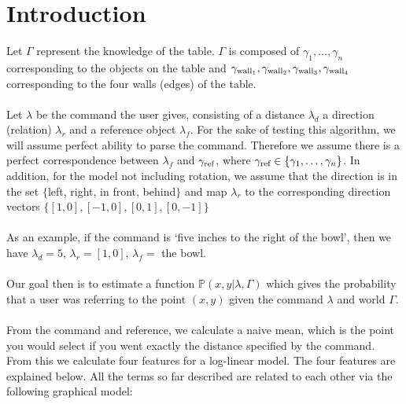 \documentclass[12pt,letterpaper]{article}
\newcommand\refobj{\textmd{ref}}
\begin{document}
\section*{Introduction}
Let $\Gamma$ represent the knowledge of the table. $\Gamma$ is composed of $\gamma_1, \ldots, \gamma_n$ corresponding to the objects on the table and $\gamma_{\textmd{wall}_1}, \gamma_{\textmd{wall}_2}, \gamma_{\textmd{wall}_3}, \gamma_{\textmd{wall}_4}$ corresponding to the four walls (edges) of the table. \\
\\
Let $\lambda$ be the command the user gives, consisting of a distance $\lambda_d$ a direction (relation) $\lambda_r$ and a reference object $\lambda_f$. For the sake of testing this algorithm, we will assume perfect ability to parse the command. Therefore we assume there is a perfect correspondence between $\lambda_f$ and $\gamma_\refobj$, where $\gamma_\refobj \in \{\gamma_1, \ldots, \gamma_n\}$. In addition, for the model not including rotation, we assume that the direction is in the set $\{$left, right, in front, behind$\}$ and map $\lambda_r$ to the corresponding direction vectors $\{[1, 0], [-1, 0], [0, 1], [0, -1]\}$\\
\\
As an example, if the command is `five inches to the right of the bowl', then we have $\lambda_d = 5$, $\lambda_r = [1, 0]$, $\lambda_f = $ the bowl. \\
\\
Our goal then is to estimate a function $\mathbb{P}(x, y | \lambda, \Gamma)$ which gives the probability that a user was referring to the point $(x, y)$ given the command $\lambda$ and world $\Gamma$. \\
\\
From the command and reference, we calculate a naive mean, which is the point you would select if you went exactly the distance specified by the command. From this we calculate four features for a log-linear model. The four features are explained below. All the terms so far described are related to each other via the following graphical model:\indent\vspace{-10pt}
\end{document}
